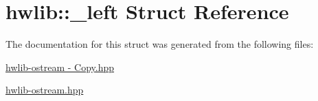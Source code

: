 \hypertarget{structhwlib_1_1__left}{}\section{hwlib\+:\+:\+\_\+left Struct Reference}
\label{structhwlib_1_1__left}


The documentation for this struct was generated from the following files\+:\begin{DoxyCompactItemize}
\item 
\hyperlink{hwlib-ostream_01-_01_copy_8hpp}{hwlib-\/ostream -\/ Copy.\+hpp}\item 
\hyperlink{hwlib-ostream_8hpp}{hwlib-\/ostream.\+hpp}\end{DoxyCompactItemize}
